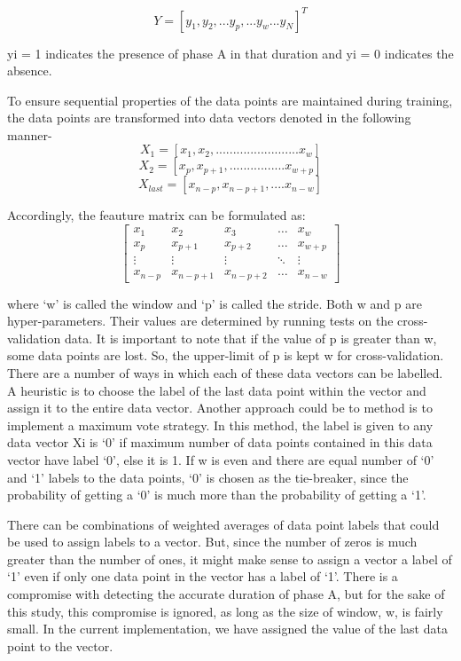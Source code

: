 \documentclass{article}
\begin{document}
\[Y =  [y_1, y_2,  ...y_p,...y_w... y_N ]^T\]

yi = 1 indicates the presence of phase A in that duration and yi = 0 indicates the absence.

To ensure sequential properties of the data points are maintained during training, the data points are transformed into data vectors denoted in the following manner-
\[X_1=  [x_1, x_2,  ........................x_w]\]
\[X_2=  [x_p, x_{p+1},  ................x_{w+p}]\]
\[X_{last}=  [x_{n-p}, x_{n-p+1},  ....x_{n-w}]\]

Accordingly, the feauture matrix can be formulated as:
\[
\begin{bmatrix}
    x_{1} & x_{2} & x_{3} & \dots  & x_{w} \\
    x_{p} & x_{p+1} & x_{p+2} & \dots  & x_{w+p} \\
    \vdots & \vdots & \vdots & \ddots & \vdots \\
    x_{n-p} & x_{n-p+1} & x_{n-p+2} & \dots  & x_{n-w}
\end{bmatrix}
\]

where ‘w’ is called the window and ‘p’ is called the stride. Both w and p are hyper-parameters. Their values are determined by running tests on the cross-validation data. It is important to note that if the value of p is greater than w, some data points are lost. So, the upper-limit of p is kept w for cross-validation. 
There are a number of ways in which each of these data vectors can be labelled. A heuristic is to choose the label of the last data point within the vector and assign it to the entire data vector. Another approach could be to method is to implement a maximum vote strategy. In this method, the label is given to any data vector Xi is ‘0’ if maximum number of data points contained in this data vector have label ‘0’, else it is 1. If w is even and there are equal number of ‘0’ and ‘1’ labels to the data points, ‘0’ is chosen as the tie-breaker, since the probability of getting a ‘0’ is much more than the probability of getting a ‘1’.

	There can be combinations of weighted averages of data point labels that could be used to assign labels to a vector. But, since the number of zeros is much greater than the number of ones, it might make sense to assign a vector a label of ‘1’ even if only one data point in the vector has a label of ‘1’. There is a compromise with detecting the accurate duration of phase A, but for the sake of this study, this compromise is ignored, as long as the size of window, w, is fairly small. In the current implementation, we have assigned the value of the last data point to the vector.
\end{document}
